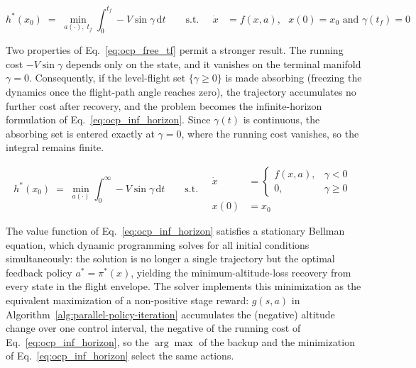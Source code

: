 \documentclass[journal ]{new-aiaa}
\begin{document}
\begin{equation}
    \label{eq:ocp_free_tf}
    h^*(x_0) \;=\; \min_{a(\cdot),\; t_f} \int_0^{t_f} -V \sin\gamma \,\mathrm{d}t
    \qquad
    \text{s.t.}
    \quad
    \begin{aligned}
        \dot{x} &= f(x, a),\text{ } x(0)= x_0 \text{ and } \gamma(t_f) = 0
    \end{aligned}
\end{equation}

Two properties of Eq.~\eqref{eq:ocp_free_tf} permit a stronger result. The
running cost $-V\sin\gamma$ depends only on the state, and it vanishes on
the terminal manifold $\gamma = 0$. Consequently, if the level-flight set
$\{\gamma \ge 0\}$ is made absorbing (freezing the dynamics once the
flight-path angle reaches zero), the trajectory accumulates no further cost
after recovery, and the problem becomes the infinite-horizon formulation of
Eq.~\eqref{eq:ocp_inf_horizon}. Since $\gamma(t)$ is continuous, the
absorbing set is entered exactly at $\gamma = 0$, where the running cost
vanishes, so the integral remains finite.

\begin{equation}
    \label{eq:ocp_inf_horizon}
    h^*(x_0) \;=\; \min_{a(\cdot)} \int_0^{\infty} -V \sin\gamma \,\mathrm{d}t
    \qquad
    \text{s.t.}
    \quad
    \begin{aligned}
        \dot{x} &=
            \begin{cases}
                f(x, a), & \gamma < 0 \\
                0,       & \gamma \ge 0
            \end{cases} \\
        x(0) &= x_0
    \end{aligned}
\end{equation}

The value function of Eq.~\eqref{eq:ocp_inf_horizon} satisfies a stationary
Bellman equation, which dynamic programming solves for all initial
conditions simultaneously: the solution is no longer a single trajectory
but the optimal feedback policy $a^* = \pi^*(x)$, yielding the
minimum-altitude-loss recovery from every state in the flight envelope.
The solver implements this minimization as the equivalent maximization
of a non-positive stage reward: $g(s,a)$ in
Algorithm~\ref{alg:parallel-policy-iteration} accumulates the
(negative) altitude change over one control interval, the negative of
the running cost of Eq.~\eqref{eq:ocp_inf_horizon}, so the $\arg\max$
of the backup and the minimization of Eq.~\eqref{eq:ocp_inf_horizon}
select the same actions.
\end{document}
